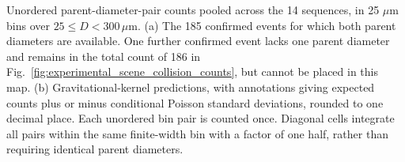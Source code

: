 Unordered parent-diameter-pair counts pooled across the 14 sequences, in 25 \(\mu\mathrm{m}\) bins over \(25\leq D<300\,\mu\mathrm{m}\). (a) The 185 confirmed events for which both parent diameters are available. One further confirmed event lacks one parent diameter and remains in the total count of 186 in Fig.~\ref{fig:experimental_scene_collision_counts}, but cannot be placed in this map. (b) Gravitational-kernel predictions, with annotations giving expected counts plus or minus conditional Poisson standard deviations, rounded to one decimal place. Each unordered bin pair is counted once. Diagonal cells integrate all pairs within the same finite-width bin with a factor of one half, rather than requiring identical parent diameters.
